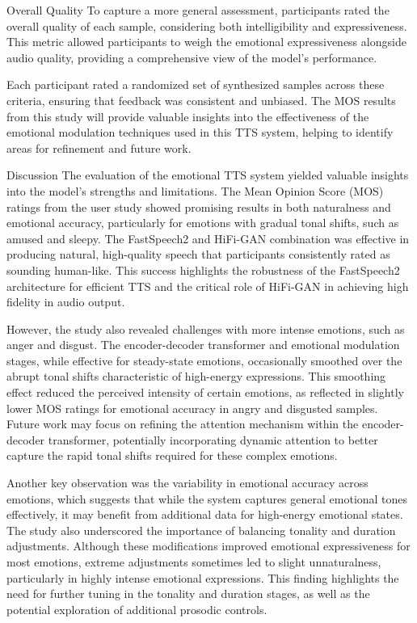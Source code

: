 Overall Quality
To capture a more general assessment, participants rated the overall quality of each sample, considering both intelligibility and expressiveness. This metric allowed participants to weigh the emotional expressiveness alongside audio quality, providing a comprehensive view of the model’s performance.

Each participant rated a randomized set of synthesized samples across these criteria, ensuring that feedback was consistent and unbiased. The MOS results from this study will provide valuable insights into the effectiveness of the emotional modulation techniques used in this TTS system, helping to identify areas for refinement and future work.

Discussion
The evaluation of the emotional TTS system yielded valuable insights into the model’s strengths and limitations. The Mean Opinion Score (MOS) ratings from the user study showed promising results in both naturalness and emotional accuracy, particularly for emotions with gradual tonal shifts, such as amused and sleepy. The FastSpeech2 and HiFi-GAN combination was effective in producing natural, high-quality speech that participants consistently rated as sounding human-like. This success highlights the robustness of the FastSpeech2 architecture for efficient TTS and the critical role of HiFi-GAN in achieving high fidelity in audio output.

However, the study also revealed challenges with more intense emotions, such as anger and disgust. The encoder-decoder transformer and emotional modulation stages, while effective for steady-state emotions, occasionally smoothed over the abrupt tonal shifts characteristic of high-energy expressions. This smoothing effect reduced the perceived intensity of certain emotions, as reflected in slightly lower MOS ratings for emotional accuracy in angry and disgusted samples. Future work may focus on refining the attention mechanism within the encoder-decoder transformer, potentially incorporating dynamic attention to better capture the rapid tonal shifts required for these complex emotions.

Another key observation was the variability in emotional accuracy across emotions, which suggests that while the system captures general emotional tones effectively, it may benefit from additional data for high-energy emotional states. The study also underscored the importance of balancing tonality and duration adjustments. Although these modifications improved emotional expressiveness for most emotions, extreme adjustments sometimes led to slight unnaturalness, particularly in highly intense emotional expressions. This finding highlights the need for further tuning in the tonality and duration stages, as well as the potential exploration of additional prosodic controls.

